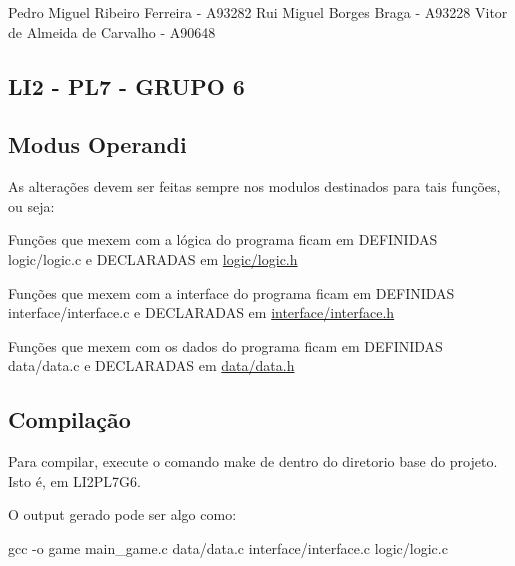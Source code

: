Pedro Miguel Ribeiro Ferreira -\/ A93282 Rui Miguel Borges Braga -\/ A93228 Vitor de Almeida de Carvalho -\/ A90648

\subsection*{L\+I2 -\/ P\+L7 -\/ G\+R\+U\+PO 6 }

\subsection*{Modus Operandi }

As alterações devem ser feitas sempre nos modulos destinados para tais funções, ou seja\+:

Funções que mexem com a lógica do programa ficam em D\+E\+F\+I\+N\+I\+D\+AS logic/logic.\+c e D\+E\+C\+L\+A\+R\+A\+D\+AS em \hyperlink{logic_8h}{logic/logic.\+h}

Funções que mexem com a interface do programa ficam em D\+E\+F\+I\+N\+I\+D\+AS interface/interface.\+c e D\+E\+C\+L\+A\+R\+A\+D\+AS em \hyperlink{interface_8h}{interface/interface.\+h}

Funções que mexem com os dados do programa ficam em D\+E\+F\+I\+N\+I\+D\+AS data/data.\+c e D\+E\+C\+L\+A\+R\+A\+D\+AS em \hyperlink{data_8h}{data/data.\+h}

\subsection*{Compilação }

Para compilar, execute o comando \textquotesingle{}make\textquotesingle{} de dentro do diretorio base do projeto. Isto é, em L\+I2\+P\+L7\+G6.

O output gerado pode ser algo como\+: 
\begin{DoxyCode}
gcc -o game main\_game.c data/data.c interface/interface.c logic/logic.c
\end{DoxyCode}
 